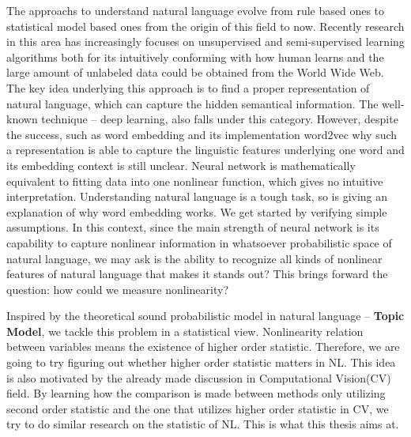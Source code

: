 \documentclass[a4paper]{book}
\begin{document}
  The approachs to understand natural language evolve from rule based
  ones to statistical model based ones from the origin of this field to
  now. Recently research in this area has increasingly focuses on
  unsupervised and semi-supervised learning algorithms both for its
  intuitively conforming with how human learns and the large amount of
  unlabeled data could be obtained from the World Wide Web. The key idea
  underlying this approach is to find a proper representation of natural
  language, which can capture the hidden semantical information. The
  well-known technique -- deep learning, also falls under this category.
  However, despite the success, such as word
  embedding\cite{DBLP:journals/corr/abs-1103-0398} and its
  implementation word2vec why such a representation is able to capture
  the linguistic features underlying one word and its embedding context
  is still unclear. Neural network is mathematically equivalent to
  fitting data into one nonlinear function, which gives no intuitive
  interpretation.  Understanding natural language is a tough task, so is
  giving an explanation of why word embedding works. We get started by
  verifying simple assumptions. In this context, since the main strength
  of neural network is its capability to capture nonlinear information
  in whatsoever probabilistic space of natural language, we may ask is
  the ability to recognize all kinds of nonlinear features of natural
  language that makes it stands out? This brings forward the question:
  how could we measure nonlinearity?

  Inspired by the theoretical sound probabilistic model in natural
  language -- \textbf{Topic Model}, we tackle this problem in a
  statistical view. Nonlinearity relation between variables means the
  existence of higher order statistic. Therefore, we are going to try
  figuring out whether higher order statistic matters in NL. This idea
  is also motivated by the already made discussion in Computational
  Vision(CV) field. By learning how the comparison is made between
  methods only utilizing second order statistic and the one that
  utilizes higher order statistic in CV, we try to do similar research
  on the statistic of NL. This is what this thesis aims at.
\end{document}
